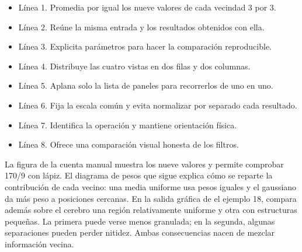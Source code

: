 
\begin{itemize}

\item Línea 1. Promedia por igual los nueve valores de cada vecindad 3 por 3.

\item Línea 2. Reúne la misma entrada y los resultados obtenidos con ella.

\item Línea 3. Explicita parámetros para hacer la comparación reproducible.

\item Línea 4. Distribuye las cuatro vistas en dos filas y dos columnas.

\item Línea 5. Aplana solo la lista de paneles para recorrerlos de uno en uno.

\item Línea 6. Fija la escala común y evita normalizar por separado cada resultado.

\item Línea 7. Identifica la operación y mantiene orientación física.

\item Línea 8. Ofrece una comparación visual honesta de los filtros.

\end{itemize}




La figura de la cuenta manual muestra los nueve valores y permite comprobar 170/9 con lápiz. El diagrama de pesos que sigue explica cómo se reparte la contribución de cada vecino: una media uniforme usa pesos iguales y el gaussiano da más peso a posiciones cercanas. En la salida gráfica de el ejemplo 18, compara además sobre el cerebro una región relativamente uniforme y otra con estructuras pequeñas. La primera puede verse menos granulada; en la segunda, algunas separaciones pueden perder nitidez. Ambas consecuencias nacen de mezclar información vecina.


